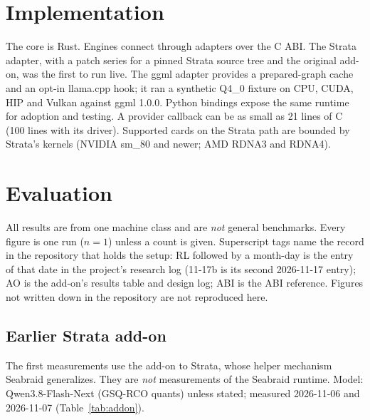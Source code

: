 \documentclass[11pt]{article}
\newcommand{\product}{Seabraid}                 %
\begin{document}
\section{Implementation}
The core is Rust. Engines connect through adapters over the C ABI. The Strata adapter, with a patch series for a
pinned Strata source tree and the original add-on, was the first to run live. The ggml adapter provides a prepared-graph
cache and an opt-in llama.cpp hook; it ran a synthetic Q4\_0 fixture on CPU, CUDA, HIP and Vulkan against ggml 1.0.0.
Python bindings expose the same runtime for adoption and testing. A provider callback can be as small as 21 lines of C (100 lines with its driver).
Supported cards on the Strata path are bounded by Strata's kernels (NVIDIA sm\_80 and newer; AMD RDNA3 and RDNA4).

\section{Evaluation}
All results are from one machine class and are \emph{not} general benchmarks. Every figure is one run ($n=1$) unless a
count is given. Superscript tags name the record in the repository that holds the setup: RL followed by a month-day is
the entry of that date in the project's research log (11-17b is its second 2026-11-17 entry); AO is the add-on's
results table and design log; ABI is the ABI reference. Figures not written down in the repository are not
reproduced here.

\subsection{Earlier Strata add-on}
The first measurements use the add-on to Strata, whose helper mechanism \product{}
generalizes. They are \emph{not} measurements of the \product{} runtime. Model: Qwen3.8-Flash-Next (GSQ-RCO quants)
unless stated; measured 2026-11-06 and 2026-11-07 (Table~\ref{tab:addon}).
\end{document}
